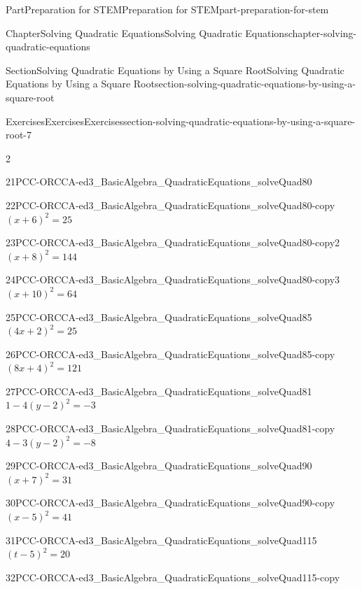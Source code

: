 \documentclass[twoside,10pt,]{book}
\numberwithin{equation}{section}
\begin{document}
\begin{partptx}{Part}{Preparation for STEM}{}{Preparation for STEM}{}{}{part-preparation-for-stem}
\begin{chapterptx}{Chapter}{Solving Quadratic Equations}{}{Solving Quadratic Equations}{}{}{chapter-solving-quadratic-equations}
\begin{sectionptx}{Section}{Solving Quadratic Equations by Using a Square Root}{}{Solving Quadratic Equations by Using a Square Root}{}{}{section-solving-quadratic-equations-by-using-a-square-root}
\begin{exercises-subsection}{Exercises}{Exercises}{}{Exercises}{}{}{section-solving-quadratic-equations-by-using-a-square-root-7}
\begin{exercisegroupcol}{2}
\begin{divisionexerciseegcol}{21}{}{}{PCC-ORCCA-ed3_BasicAlgebra_QuadraticEquations_solveQuad80}
\end{divisionexerciseegcol}%
\begin{divisionexerciseegcol}{22}{}{}{PCC-ORCCA-ed3_BasicAlgebra_QuadraticEquations_solveQuad80-copy}%
\(\left(x+6\right)^2 = 25\)%
\end{divisionexerciseegcol}%
\begin{divisionexerciseegcol}{23}{}{}{PCC-ORCCA-ed3_BasicAlgebra_QuadraticEquations_solveQuad80-copy2}%
\(\left(x+8\right)^2 = 144\)%
\end{divisionexerciseegcol}%
\begin{divisionexerciseegcol}{24}{}{}{PCC-ORCCA-ed3_BasicAlgebra_QuadraticEquations_solveQuad80-copy3}%
\(\left(x+10\right)^2 = 64\)%
\end{divisionexerciseegcol}%
\begin{divisionexerciseegcol}{25}{}{}{PCC-ORCCA-ed3_BasicAlgebra_QuadraticEquations_solveQuad85}%
\(\left(4x+2\right)^2 = 25\)%
\end{divisionexerciseegcol}%
\begin{divisionexerciseegcol}{26}{}{}{PCC-ORCCA-ed3_BasicAlgebra_QuadraticEquations_solveQuad85-copy}%
\(\left(8x+4\right)^2 = 121\)%
\end{divisionexerciseegcol}%
\begin{divisionexerciseegcol}{27}{}{}{PCC-ORCCA-ed3_BasicAlgebra_QuadraticEquations_solveQuad81}%
\(1 - 4 ( y - 2 )^2 = -3\)%
\end{divisionexerciseegcol}%
\begin{divisionexerciseegcol}{28}{}{}{PCC-ORCCA-ed3_BasicAlgebra_QuadraticEquations_solveQuad81-copy}%
\(4 - 3 ( y - 2 )^2 = -8\)%
\end{divisionexerciseegcol}%
\begin{divisionexerciseegcol}{29}{}{}{PCC-ORCCA-ed3_BasicAlgebra_QuadraticEquations_solveQuad90}%
\((x+7)^2  = 31\)%
\end{divisionexerciseegcol}%
\begin{divisionexerciseegcol}{30}{}{}{PCC-ORCCA-ed3_BasicAlgebra_QuadraticEquations_solveQuad90-copy}%
\((x - 5)^2  = 41\)%
\end{divisionexerciseegcol}%
\begin{divisionexerciseegcol}{31}{}{}{PCC-ORCCA-ed3_BasicAlgebra_QuadraticEquations_solveQuad115}%
\((t - 5)^2 = 20\)%
\end{divisionexerciseegcol}%
\begin{divisionexerciseegcol}{32}{}{}{PCC-ORCCA-ed3_BasicAlgebra_QuadraticEquations_solveQuad115-copy}%

\end{divisionexerciseegcol}
\end{exercisegroupcol}
\end{exercises-subsection}
\end{sectionptx}
\end{chapterptx}
\end{partptx}
\end{document}
